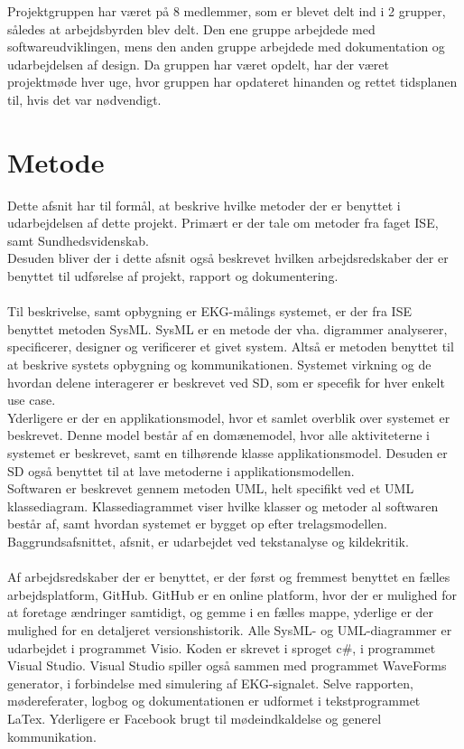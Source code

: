 Projektgruppen har været på 8 medlemmer, som er blevet delt ind i 2 grupper, således at arbejdsbyrden blev delt. Den ene gruppe arbejdede med softwareudviklingen, mens den anden gruppe arbejdede med dokumentation og udarbejdelsen af design. Da gruppen har været opdelt, har der været projektmøde hver uge, hvor gruppen har opdateret hinanden og rettet tidsplanen til, hvis det var nødvendigt.


\section{Metode} 
Dette afsnit har til formål, at beskrive hvilke metoder der er benyttet i udarbejdelsen af dette projekt. Primært er der tale om metoder fra faget ISE, samt Sundhedsvidenskab.\\ 
Desuden bliver der i dette afsnit også beskrevet hvilken arbejdsredskaber der er benyttet til udførelse af projekt, rapport og dokumentering.\\ \\
Til beskrivelse, samt opbygning er EKG-målings systemet, er der fra ISE benyttet metoden SysML. SysML er en metode der vha. digrammer analyserer, specificerer, designer og verificerer et givet system. Altså er metoden benyttet til at beskrive systets opbygning og kommunikationen. Systemet virkning og de hvordan delene interagerer er beskrevet ved SD, som er specefik for hver enkelt use case.\\ 
Yderligere er der en applikationsmodel, hvor et samlet overblik over systemet er beskrevet. Denne model består af en domænemodel, hvor alle aktiviteterne i systemet er beskrevet, samt en tilhørende klasse applikationsmodel. Desuden er SD også benyttet til at lave metoderne i applikationsmodellen.\\ 
Softwaren er beskrevet gennem metoden UML, helt specifikt ved et UML klassediagram. Klassediagrammet viser hvilke klasser og metoder al softwaren består af, samt hvordan systemet er bygget op efter trelagsmodellen.\\
Baggrundsafsnittet, afsnit, er udarbejdet ved tekstanalyse og kildekritik.\\ \\
Af arbejdsredskaber der er benyttet, er der først og fremmest benyttet en fælles arbejdsplatform, GitHub. GitHub er en online platform, hvor der er mulighed for at foretage ændringer samtidigt, og gemme i en fælles mappe, yderlige er der mulighed for en detaljeret versionshistorik. Alle SysML- og UML-diagrammer er udarbejdet i programmet Visio. Koden er skrevet i sproget c\#, i programmet Visual Studio. Visual Studio spiller også sammen med programmet WaveForms generator, i forbindelse med simulering af EKG-signalet. Selve rapporten, mødereferater, logbog og dokumentationen er udformet i tekstprogrammet LaTex. Yderligere er Facebook brugt til mødeindkaldelse og generel kommunikation.



